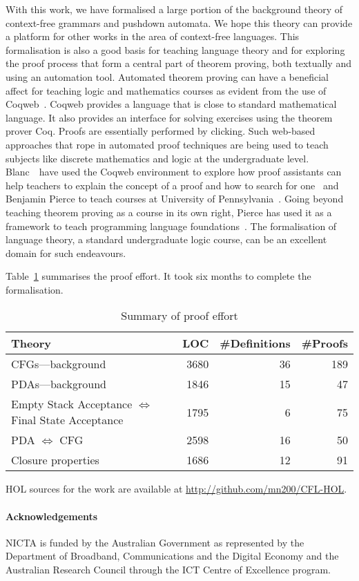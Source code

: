 With this work, we have formalised a large portion of the background
theory of context-free grammars and pushdown automata. We hope this
theory can provide a platform for other works in the area of
context-free languages. This formalisation is also a good basis for
teaching language theory and for exploring the proof process that form
a central part of theorem proving, both textually and using an
automation tool. Automated theorem proving can have a beneficial
affect for teaching logic and mathematics courses as evident from the
use of Coqweb~\citep{coqweb}.  Coqweb provides a language that is
close to standard mathematical language. It also provides an interface
for solving exercises using the theorem prover Coq. Proofs are
essentially performed by clicking. Such web-based approaches that rope
in automated proof techniques are being used to teach subjects like
discrete mathematics and logic at the undergraduate
level. Blanc~\et~have used the Coqweb environment to explore how proof
assistants can help teachers to explain the concept of a proof and how
to search for one~\citep{pate07} and Benjamin Pierce to teach courses
at University of Pennsylvania~\citep{Pierce:LambdaTA-ITP}. Going
beyond teaching theorem proving as a course in its own right, Pierce
has used it as a framework to teach programming language
foundations~\citep{Pierce:LambdaTA}. The formalisation of language
theory, a standard undergraduate logic course, can be an excellent
domain for such endeavours.

Table~\ref{tab:numbers} summarises the proof effort. It took six
months to complete the formalisation.
\begin{table}[!ht]
\begin{center}
\begin{tabular}{lrrr}
  \textbf{Theory}&\textbf{LOC}&\textbf{\#Definitions}&\textbf{\#Proofs}\\
  \hline
  CFGs---background       & 3680 & 36 & 189 \\
  PDAs---background        & 1846 & 15 & 47 \\
  Empty Stack Acceptance $\iff$ Final State Acceptance & 1795 & 6 & 75 \\
  PDA $\iff$ CFG & 2598 & 16 & 50\\
  Closure properties & 1686 & 12 & 91\\
\end{tabular}
\end{center}
\caption{Summary of proof effort}
\label{tab:numbers}
\end{table}

HOL sources for the work are available at \url{http://github.com/mn200/CFL-HOL}.

\paragraph{Acknowledgements}
NICTA is funded by the Australian Government as represented by the
Department of Broadband, Communications and the Digital Economy and
the Australian Research Council through the ICT Centre of Excellence
program.



